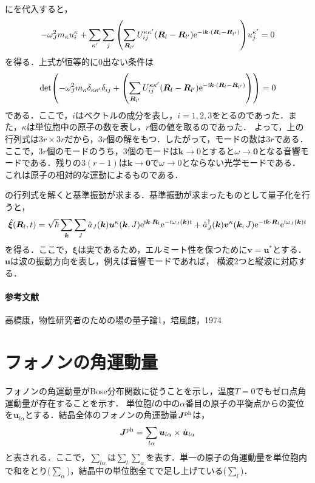 \documentclass{report}
\begin{document}
にを代入すると，
\begin{align}
  -\omega_J^2 m_\kappa u_{i}^{\kappa} + \sum_{\kappa'} \sum_{j} \qty(\sum_{\bm{R}_{l'}} U_{ij}^{\kappa\kappa'}(\bm{R}_l - \bm{R}_{l'})\mathrm{e}^{-\mathrm{i}\bm{k}\cdot(\bm{R}_l-\bm{R}_{l'})}) u_j^{\kappa'}=0
\end{align}
を得る．上式が恒等的に0出ない条件は
\begin{align}
  \det(-\omega_J^2 m_{\kappa}\delta_{\kappa\kappa'}\delta_{ij} + \qty(\sum_{\bm{R}_{l'}} U_{ij}^{\kappa\kappa'}(\bm{R}_l - \bm{R}_{l'})\mathrm{e}^{-\mathrm{i}\bm{k}\cdot(\bm{R}_l-\bm{R}_{l'})})) = 0 \label{det}
\end{align}
である．ここで，$i$はベクトルの成分を表し，$i=1,2,3$をとるのであった．また，$\kappa$は単位胞中の原子の数を表し，$r$個の値を取るのであった．
よって，上の行列式は$3r\times 3r$だから，$3r$個の解をもつ．したがって，モードの数は$3r$である．ここで，$3r$個のモードのうち，3個のモードは$\bm{k}\to0$とすると$\omega\to\bm{0}$となる音響モードである．残りの$3(r-1)$は$\bm{k}\to\bm{0}$で$\omega\to0$とならない光学モードである．
これは原子の相対的な運動によるものである．

の行列式を解くと基準振動が求まる．基準振動が求まったものとして量子化を行うと，
\begin{align}
  \hat{\bm{\xi}} (\bm{R}_l,t) = \sqrt{\hbar}\sum_{\bm{k}}\sum_{J} \hat{a}_J (\bm{k})\bm{u}^{\kappa}(\bm{k},J)\mathrm{e}^{\mathrm{i}\bm{k}\cdot\bm{R}_l}\mathrm{e}^{-\mathrm{i}\omega_J(\bm{k})t} + \hat{a}^{\dagger}_{J}(\bm{k})\bm{v}^{\kappa}(\bm{k},J)\mathrm{e}^{-\mathrm{i}\bm{k}\cdot\bm{R}_l}\mathrm{e}^{\mathrm{i}\omega_J(\bm{k})t}
\end{align}
を得る．ここで，$\bm{\xi}$は実であるため，エルミート性を保つために$\bm{v}=\bm{u}^{*}$とする．$\bm{u}$は波の振動方向を表し，例えば音響モードであれば，
横波2つと縦波に対応する．

\paragraph*{参考文献}
高橋康，物性研究者のための場の量子論1，培風館，1974

\section{フォノンの角運動量}
フォノンの角運動量がBose分布関数に従うことを示し，温度$T=0$でもゼロ点角運動量が存在することを示す．
単位胞$l$の中の$\alpha$番目の原子の平衡点からの変位を$\bm{u}_{l\alpha}$とする．結晶全体のフォノンの角運動量$\bm{J}^{\mathrm{ph}}$は，
\begin{align}
  \bm{J}^{\mathrm{ph}} = \sum_{l\alpha} \bm{u}_{l\alpha} \times \dot{\bm{u}}_{l\alpha}
\end{align}
と表される．ここで，$\sum_{l\alpha}$は$\sum_{l}\sum_{\alpha}$を表す．単一の原子の角運動量を単位胞内で和をとり($\sum_{\alpha}$)，結晶中の単位胞全てで足し上げている($\sum_{l}$)．
\end{document}

